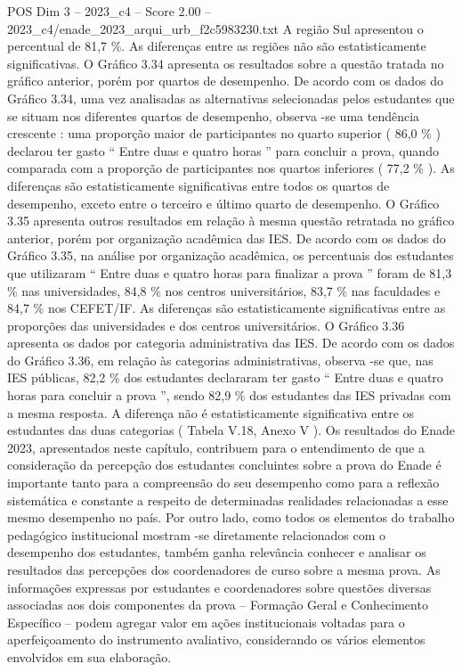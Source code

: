 \begin{textsample}{POS Dim 3 – 2023\_c4 – Score 2.00 – 2023\_c4/enade\_2023\_arqui\_urb\_f2c5983230.txt}
A região Sul apresentou o percentual de 81,7 \%.
As diferenças entre as regiões não são estatisticamente significativas.
O Gráfico 3.34 apresenta os resultados sobre a questão tratada no gráfico anterior, porém por quartos de desempenho.
De acordo com os dados do Gráfico 3.34, uma vez analisadas as alternativas selecionadas pelos estudantes que se situam nos diferentes quartos de desempenho, observa -se uma tendência crescente : uma proporção maior de participantes no quarto superior ( 86,0 \% ) declarou ter gasto “ Entre duas e quatro horas ” para concluir a prova, quando comparada com a proporção de participantes nos quartos inferiores ( 77,2 \% ).
As diferenças são estatisticamente significativas entre todos os quartos de desempenho, exceto entre o terceiro e último quarto de desempenho.
O Gráfico 3.35 apresenta outros resultados em relação à mesma questão retratada no gráfico anterior, porém por organização acadêmica das IES.
De acordo com os dados do Gráfico 3.35, na análise por organização acadêmica, os percentuais dos estudantes que utilizaram “ Entre duas e quatro horas para finalizar a prova ” foram de 81,3 \% nas universidades, 84,8 \% nos centros universitários, 83,7 \% nas faculdades e 84,7 \% nos CEFET/IF.
As diferenças são estatisticamente significativas entre as proporções das universidades e dos centros universitários.
O Gráfico 3.36 apresenta os dados por categoria administrativa das IES.
De acordo com os dados do Gráfico 3.36, em relação às categorias administrativas, observa -se que, nas IES públicas, 82,2 \% dos estudantes declararam ter gasto “ Entre duas e quatro horas para concluir a prova ”, sendo 82,9 \% dos estudantes das IES privadas com a mesma resposta.
A diferença não é estatisticamente significativa entre os estudantes das duas categorias ( Tabela V.18, Anexo V ).
Os resultados do Enade 2023, apresentados neste capítulo, contribuem para o entendimento de que a consideração da percepção dos estudantes concluintes sobre a prova do Enade é importante tanto para a compreensão do seu desempenho como para a reflexão sistemática e constante a respeito de determinadas realidades relacionadas a esse mesmo desempenho no país.
Por outro lado, como todos os elementos do trabalho pedagógico institucional mostram -se diretamente relacionados com o desempenho dos estudantes, também ganha relevância conhecer e analisar os resultados das percepções dos coordenadores de curso sobre a mesma prova.
As informações expressas por estudantes e coordenadores sobre questões diversas associadas aos dois componentes da prova – Formação Geral e Conhecimento Específico – podem agregar valor em ações institucionais voltadas para o aperfeiçoamento do instrumento avaliativo, considerando os vários elementos envolvidos em sua elaboração.

\end{textsample}
